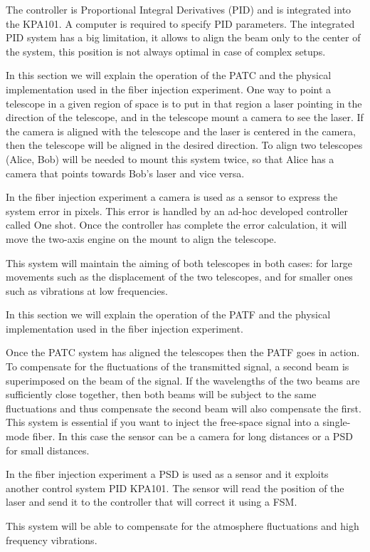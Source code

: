 The  controller is Proportional Integral Derivatives (PID) and is integrated into the KPA101. A computer is required to specify PID parameters. The integrated PID system has a big limitation, it allows to align the beam only to the center of the system, this position is not always optimal in case of complex setups.

In this section we will explain the operation of the PATC and the physical implementation used in the fiber injection experiment.
One way to point a telescope in a given region of space is to put in that region a laser pointing in the direction of the telescope, and in the telescope mount a camera to see the laser.
If the camera is aligned with the telescope and the laser is centered in the camera, then the telescope will be aligned in the desired direction.
To align two telescopes (Alice, Bob) will be needed to mount this system twice, so that Alice has a camera that points towards Bob’s laser and vice versa.

In the fiber injection experiment a camera is used as a sensor to express the system error in pixels. This error is handled by an ad-hoc developed controller called One shot. Once the controller has complete the error calculation, it will move the two-axis engine on the mount to align the telescope.

This system will maintain the aiming of both telescopes in both cases: for large movements such as the displacement of the two telescopes, and for smaller ones such as vibrations at low frequencies.


In this section we will explain the operation of the PATF and the physical implementation used in the fiber injection experiment.

Once the PATC system has aligned the telescopes then the PATF goes in action. To compensate for the fluctuations of the transmitted signal, a second beam is superimposed on the beam of the signal. If the wavelengths of the two beams are sufficiently close together, then both beams will be subject to the same fluctuations and thus compensate the second beam will also compensate the first.
This system is essential if you want to inject the free-space signal into a single-mode fiber. In this case the sensor can be a camera for long distances or a PSD for small distances.

In the fiber injection experiment a PSD is used as a sensor and it exploits another control system PID KPA101. The sensor will read the position of the laser and send it to the controller that will correct it using a FSM.

This system will be able to compensate for the atmosphere fluctuations and high frequency vibrations.


